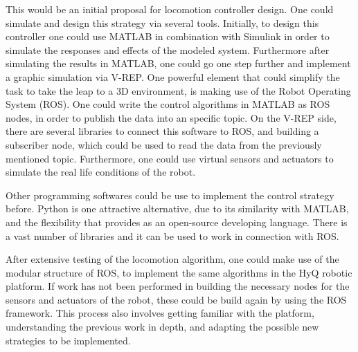 \documentclass[main.tex]{subfiles}
\begin{document}
	This would be an initial proposal for locomotion controller design. One could simulate and design this strategy via several tools. Initially, to design this controller one could use MATLAB in combination with Simulink in order to simulate the responses and effects of the modeled system. Furthermore after simulating the results in MATLAB, one could go one step further and implement a graphic simulation via V-REP. One powerful element that could simplify the task to take the leap to a 3D environment, is making use of the Robot Operating System (ROS). One could write the control algorithms in MATLAB as ROS nodes, in order to publish the data into an specific topic. On the V-REP side, there are several libraries to connect this software to ROS, and building a subscriber node, which could be used to read the data from the previously mentioned topic. Furthermore, one could use virtual sensors and actuators to simulate the real life conditions of the robot.
	
	Other programming softwares could be use to implement the control strategy before. Python is one attractive alternative, due to its similarity with MATLAB, and the flexibility that provides as an open-source developing language. There is a vast number of libraries and it can be used to work in connection with ROS. 
	
	After extensive testing of the locomotion algorithm, one could make use of the modular structure of ROS, to implement the same algorithms in the HyQ robotic platform. If work has not been performed in building the necessary nodes for the sensors and actuators of the robot, these could be build again by using the ROS framework. This process also involves getting familiar with the platform, understanding the previous work in depth, and adapting the possible new strategies to be implemented.
	\iffalse
	\begin{enumerate}
		\item Design max-plus algebra system for the four-legged robot HyQ, design the scheduling for different types of gaits (adapt the framework).
		\item Design the reference generator for each of the legs based on trajectory design for each leg using their dynamic model (screw theory)
		\item Implementation of supervisory control based on sensor data to select the proper gait depending on the situation where the robot is
		\item Analyze robustness of the designed algorithm based on the theory and properties of the max-plus algebra system
		\item Perform simulations in software (V-REP) and ROS
		\item After simulations start testing in the robot
	\end{enumerate}
	\fi 
\end{document}
